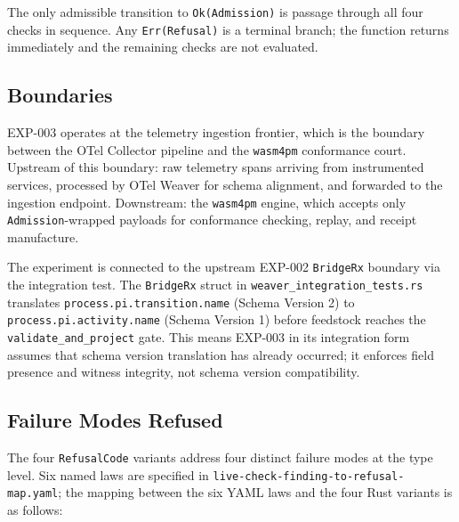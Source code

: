 The only admissible transition to \texttt{Ok(Admission)} is passage through all
four checks in sequence. Any \texttt{Err(Refusal)} is a terminal branch; the function
returns immediately and the remaining checks are not evaluated.

\subsection{Boundaries}
\label{sec:otel-weaver-exp-003-live-check-to-refusal-architecture-boundaries}

EXP-003 operates at the telemetry ingestion frontier, which is the boundary between
the OTel Collector pipeline and the \texttt{wasm4pm} conformance court. Upstream of
this boundary: raw telemetry spans arriving from instrumented services, processed by
OTel Weaver for schema alignment, and forwarded to the ingestion endpoint. Downstream:
the \texttt{wasm4pm} engine, which accepts only \texttt{Admission}-wrapped payloads
for conformance checking, replay, and receipt manufacture.

The experiment is connected to the upstream EXP-002 \texttt{BridgeRx} boundary via
the integration test. The \texttt{BridgeRx} struct in \texttt{weaver\_integration\_tests.rs}
translates \texttt{process.pi.transition.name} (Schema Version 2) to
\texttt{process.pi.activity.name} (Schema Version 1) before feedstock reaches the
\texttt{validate\_and\_project} gate. This means EXP-003 in its integration form
assumes that schema version translation has already occurred; it enforces field
presence and witness integrity, not schema version compatibility.

\subsection{Failure Modes Refused}
\label{sec:otel-weaver-exp-003-live-check-to-refusal-architecture-failures}

The four \texttt{RefusalCode} variants address four distinct failure modes at the
type level. Six named laws are specified in
\texttt{live-check-finding-to-refusal-map.yaml}; the mapping between the six YAML
laws and the four Rust variants is as follows:

